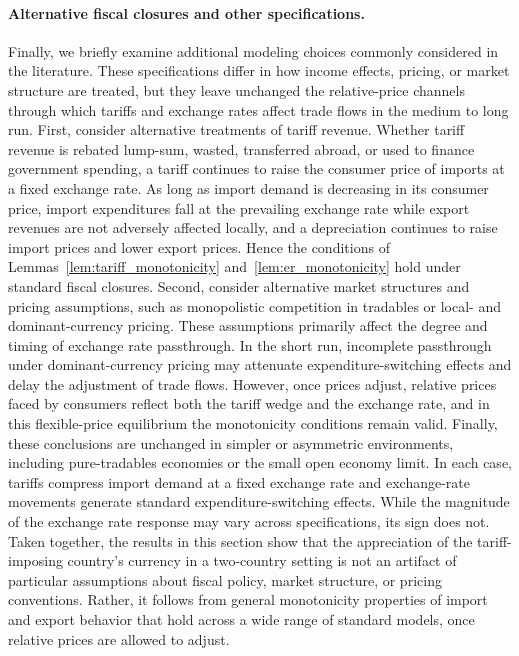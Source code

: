 \documentclass[11pt]{article}
\theoremstyle{plain}
\theoremstyle{remark}
\numberwithin{lemma}{section}
\numberwithin{proposition}{section}
\numberwithin{corollary}{section}
\begin{document}
\begin{appendix}
\paragraph{Alternative fiscal closures and other specifications.}
Finally, we briefly examine additional modeling choices commonly considered in the literature. These specifications differ in how income effects, pricing, or market structure are treated, but they leave unchanged the relative-price channels through which tariffs and exchange rates affect trade flows in the medium to long run. First, consider alternative treatments of tariff revenue. Whether tariff revenue is rebated lump-sum, wasted, transferred abroad, or used to finance government spending, a tariff continues to raise the consumer price of imports at a fixed exchange rate. As long as import demand is decreasing in its consumer price, import expenditures fall at the prevailing exchange rate while export revenues are not adversely affected locally, and a depreciation continues to raise import prices and lower export prices. Hence the conditions of Lemmas~\ref{lem:tariff_monotonicity} and~\ref{lem:er_monotonicity} hold under standard fiscal closures. Second, consider alternative market structures and pricing assumptions, such as monopolistic competition in tradables or local- and dominant-currency pricing. These assumptions primarily affect the degree and timing of exchange rate passthrough. In the short run, incomplete passthrough under dominant-currency pricing may attenuate expenditure-switching effects and delay the adjustment of trade flows. However, once prices adjust, relative prices faced by consumers reflect both the tariff wedge and the exchange rate, and in this flexible-price equilibrium the monotonicity conditions remain valid. Finally, these conclusions are unchanged in simpler or asymmetric environments, including pure-tradables economies or the small open economy limit. In each case, tariffs compress import demand at a fixed exchange rate and exchange-rate movements generate standard expenditure-switching effects. While the magnitude of the exchange rate response may vary across specifications, its sign does not. Taken together, the results in this section show that the appreciation of the tariff-imposing country's currency in a two-country setting is not an artifact of particular assumptions about fiscal policy, market structure, or pricing conventions. Rather, it follows from general monotonicity properties of import and export behavior that hold across a wide range of standard models, once relative prices are allowed to adjust.


\end{appendix}
\end{document}
